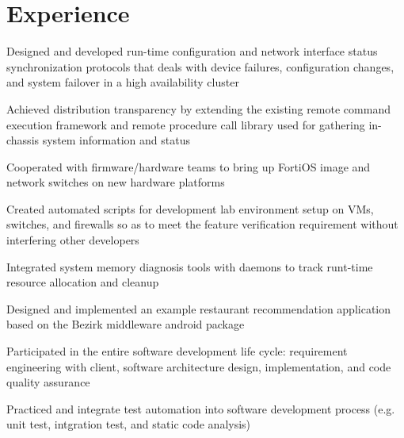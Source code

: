 \documentclass[letterpaper]{deedy-resume} %
\begin{document}
\begin{minipage}[t]{0.645\textwidth} %


\section{Experience}


\vspace{\topsep} %
\begin{tightitemize}
\item Designed and developed run-time configuration and network interface status synchronization protocols that deals with device failures, configuration changes, and system failover in a high availability cluster
\item Achieved distribution transparency by extending the existing remote command execution framework and remote procedure call library used for gathering in-chassis system information and status
\item Cooperated with firmware/hardware teams to bring up FortiOS image and network switches on new hardware platforms
\item Created automated scripts for development lab environment setup on VMs, switches, and firewalls so as to meet the feature verification requirement without interfering other developers
\item Integrated system memory diagnosis tools with daemons to track runt-time resource allocation and cleanup 
\end{tightitemize}

\sectionspace %


\begin{tightitemize}
\item Designed and implemented an example restaurant recommendation application based on the Bezirk middleware android package
\item Participated in the entire software development life cycle: requirement engineering with client, software architecture design, implementation, and code quality assurance
\item Practiced and integrate test automation into software development process (e.g. unit test, intgration test, and static code analysis)
\end{tightitemize}


\end{minipage}
\end{document}
